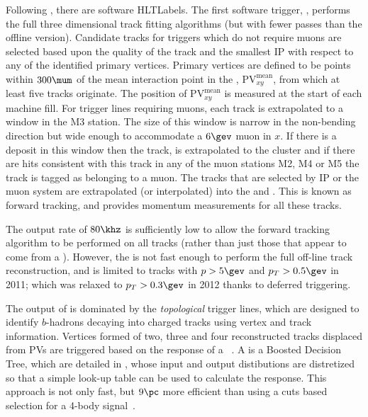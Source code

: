 Following \lone, there are software \glspl{HLTLabel}.
The first software trigger, \hltone, performs the full three dimensional \velo track fitting
algorithms (but with fewer passes than the offline version).
Candidate \velo tracks for triggers which do not require muons are selected based upon the quality of the
\velo track and the smallest IP with respect to any of the identified primary vertices.
Primary vertices are defined to be points within $300\mum$ of the mean
interaction point in the , $\mathrm{PV}^\mathrm{mean}_{xy}$, from which at least five
tracks originate.
The position of $\mathrm{PV}^\mathrm{mean}_{xy}$ is measured at the start of each \lhc machine
fill.
For trigger lines requiring muons, each \velo track is extrapolated to a window in the M3
station.
The size of this window is narrow in the non-bending direction but wide enough to accommodate a $6\gev$
muon in $x$.
If there is a deposit in this window then the \velo track, is extrapolated to the cluster and if
there are hits consistent with this track in any of the muon stations M2, M4 or M5 the track is
tagged as belonging to a muon.
The \velo tracks that are selected by IP or the muon system are extrapolated (or interpolated) into
the \intr and \ot.
This is known as forward tracking, and provides momentum measurements for all these tracks.


The \hltone output rate of $80\khz$ is sufficiently low to allow the forward tracking algorithm to
be performed on all \velo tracks (rather than just those that appear to come from a \pv).
However, the \hlttwo is not fast enough to perform the full off-line track reconstruction, and
is limited to \velo tracks with
$p>5\gev$ and $p_T>0.5\gev$ in 2011; which was relaxed to $p_T>0.3\gev$ in 2012 thanks to deferred
triggering.

The output of \hlttwo is dominated by the \emph{topological} trigger lines, which are designed to
identify $b$-hadrons decaying into charged tracks using vertex and track information.
Vertices formed of two, three and four reconstructed tracks displaced from PVs are triggered based
on the response of a \BBDT~\cite{Gligorov:2012qt}.
A \BBDT is a Boosted Decision Tree, which are detailed in , whose input and output
distibutions are distretized so that a simple look-up table can be used to calculate the response.
This approach is not only fast, but $9\pc$ more efficient than using a cuts based selection for a
4-body signal~\cite{Gligorov:2012qt}.



